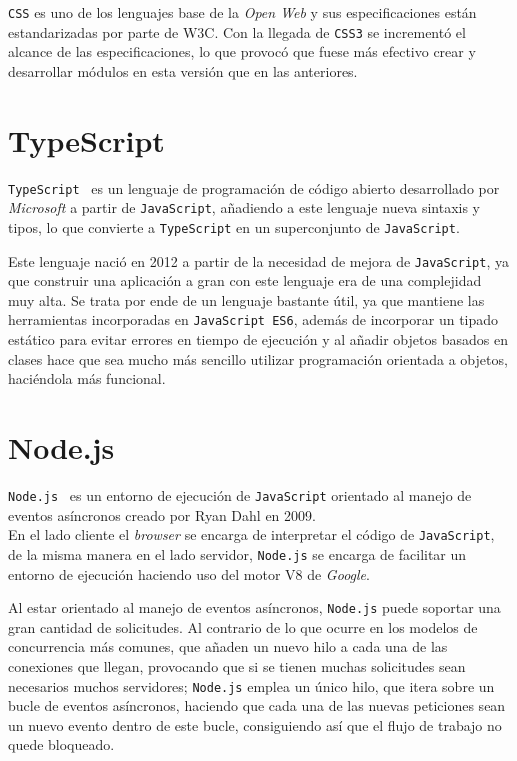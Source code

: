 \documentclass[a4paper, 12pt]{book}
\begin{document}
\texttt{CSS} es uno de los lenguajes base de la \textit{Open Web} y sus especificaciones están estandarizadas por parte de W3C. Con la llegada de \texttt{CSS3} se incrementó el alcance de las especificaciones, lo que provocó que fuese más efectivo crear y desarrollar módulos en esta versión que en las anteriores.

\section{TypeScript}
\label{sec:typescript}

\texttt{TypeScript}~\cite{typescript} es un lenguaje de programación de código abierto desarrollado por \textit{Microsoft} a partir de \texttt{JavaScript}, añadiendo a este lenguaje nueva sintaxis y tipos, lo que convierte a \texttt{TypeScript} en un superconjunto de \texttt{JavaScript}.

Este lenguaje nació en 2012 a partir de la necesidad de mejora de \texttt{JavaScript}, ya que construir una aplicación a gran con este lenguaje era de una complejidad muy alta. Se trata por ende de un lenguaje bastante útil, ya que mantiene las herramientas incorporadas en \texttt{JavaScript ES6}, además de incorporar un tipado estático para evitar errores en tiempo de ejecución y al añadir objetos basados en clases hace que sea mucho más sencillo utilizar programación orientada a objetos, haciéndola más funcional.

\section{Node.js}
\label{sec:nodejs}

\texttt{Node.js}~\cite{nodejs} es un entorno de ejecución de \texttt{JavaScript} orientado al manejo de eventos asíncronos creado por Ryan Dahl en 2009.\\
En el lado cliente el \textit{browser} se encarga de interpretar el código de \texttt{JavaScript}, de la misma manera en el lado servidor, \texttt{Node.js} se encarga de facilitar un entorno de ejecución haciendo uso del motor V8 de \textit{Google}.

Al estar orientado al manejo de eventos asíncronos, \texttt{Node.js} puede soportar una gran cantidad de solicitudes. Al contrario de lo que ocurre en los modelos de concurrencia más comunes, que añaden un nuevo hilo a cada una de las conexiones que llegan, provocando que si se tienen muchas solicitudes sean necesarios muchos servidores; \texttt{Node.js} emplea un único hilo, que itera sobre un bucle de eventos asíncronos, haciendo que cada una de las nuevas peticiones sean un nuevo evento dentro de este bucle, consiguiendo así que el flujo de trabajo no quede bloqueado.
\end{document}
